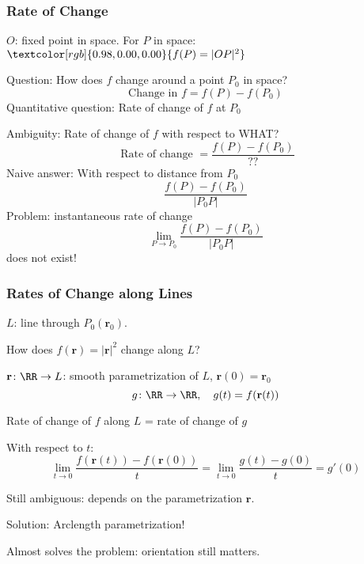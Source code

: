 \begin{frame}
  \frametitle{Rate of Change}

  $O$: fixed point in space. For $P$ in space:
  $\textcolor[rgb]{0.98,0.00,0.00}{f(P) = |OP|^2}$

  Question: How does $f$ change around a point $P_0$ in space? \pause
  $$\text{Change in } f = f(P) - f(P_0)$$
  \pause \textcolor[rgb]{0.98,0.00,0.00}{Quantitative} question: \pause
  \textcolor[rgb]{0.98,0.00,0.00}{Rate of change} of $f$ at $P_0$

  \pause Ambiguity: \pause Rate of change of $f$ with respect to WHAT?
  $$\text{ Rate of change } = \frac{f(P) - f(P_0)}{??}$$
  \pause Naive answer: \pause With respect to
  \textcolor[rgb]{0.00,0.00,0.00}{distance} from $P_0$
  $$\frac{f(P) - f(P_0)}{|P_0P|}$$
  \pause Problem: \pause
  \textcolor[rgb]{0.98,0.00,0.00}{instantaneous rate of change}
  $$\lim_{P\to P_0} \frac{f(P)-f(P_0)}{|P_0P|}$$
  does not exist!
\end{frame}

\begin{frame}
  \frametitle{Rates of Change along Lines}

  $L$: line through $P_0(\textbf{r}_0)$.

  \pause
  \begin{center}
    How does $f(\textbf{r}) = |\textbf{r}|^2$
  change \textcolor[rgb]{0.98,0.00,0.00}{along $L$}?
  \end{center}

  \pause $\textbf{r} \colon \RR \to L$: smooth parametrization of $L$,
  $\textbf{r}(0) = \textbf{r}_0$
  $$g\colon \RR \to \RR, \quad g(t) = f(\textbf{r}(t))$$
  \begin{center}
    Rate of change of $f$ along $L$ = rate of change of $g$
  \end{center}

  \pause With respect to $t$:
  $$\lim_{t\to 0} \frac{f(\textbf{r}(t))-f(\textbf{r}(0))}{t} =
  \lim_{t\to 0} \frac{g(t)-g(0)}{t} = g'(0)$$

  \pause Still ambiguous: \pause depends on the parametrization $\textbf{r}$.\pause

  Solution: \pause Arclength parametrization! \pause

  Almost solves the problem: \pause orientation still matters.
\end{frame}

